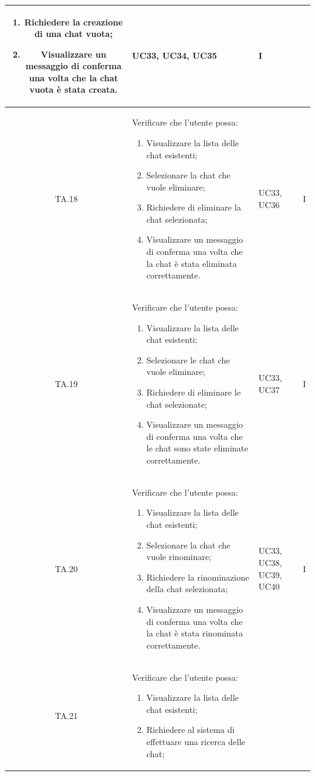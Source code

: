 \documentclass[10pt, a4paper]{article}
\begin{document}
\begin{xltabular}{\textwidth}{|c|X|p{2.5cm}|c|}
\begin{enumerate}
    \item Richiedere la creazione di una chat vuota;
    \item Visualizzare un messaggio di conferma una volta che la chat vuota è stata creata.
\end{enumerate}
& UC33, UC34, UC35 & I \\
\hline
TA.18 & Verificare che l'utente possa:
\begin{enumerate}
    \item Visualizzare la lista delle chat esistenti;
    \item Selezionare la chat che vuole eliminare;
    \item Richiedere di eliminare la chat selezionata;
    \item Visualizzare un messaggio di conferma una volta che la chat è stata eliminata correttamente.
\end{enumerate}
& UC33, UC36 & I \\
\hline
TA.19 & Verificare che l'utente possa:
\begin{enumerate}
    \item Visualizzare la lista delle chat esistenti;
    \item Selezionare le chat che vuole eliminare;
    \item Richiedere di eliminare le chat selezionate;
    \item Visualizzare un messaggio di conferma una volta che le chat sono state eliminate correttamente.
\end{enumerate}
& UC33, UC37 & I \\
\hline
TA.20 & Verificare che l'utente possa:
\begin{enumerate}
    \item Visualizzare la lista delle chat esistenti;
    \item Selezionare la chat che vuole rinominare;
    \item Richiedere la rinominazione della chat selezionata;
    \item Visualizzare un messaggio di conferma una volta che la chat è stata rinominata correttamente.
\end{enumerate}
& UC33, UC38, UC39, UC40 & I \\
\hline
TA.21 & Verificare che l'utente possa:
\begin{enumerate}
    \item Visualizzare la lista delle chat esistenti;
    \item Richiedere al sistema di effettuare una ricerca delle chat;

\end{enumerate}
\end{xltabular}
\end{document}
